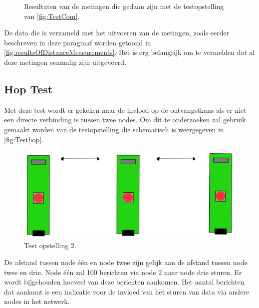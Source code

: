 \begin{figure}[ht]
    \centering
    \caption{Resultaten van de metingen die gedaan zijn met de testopstelling van \autoref{fig:TestCom}.}
    \label{fig:resultsOfDistanceMeasurements}
\end{figure}
De data die is verzameld met het uitvoeren van de metingen, zoals eerder beschreven in deze paragraaf worden getoond in \autoref{fig:resultsOfDistanceMeasurements}. Het is erg belangrijk om te vermelden dat al deze metingen eenmalig zijn uitgevoerd.

\subsection{Hop Test} \label{sec:influenceOfHopsInNetwork}
Met deze test wordt er gekeken naar de invloed op de ontvangstkans als er niet een directe verbinding is tussen twee nodes. Om dit te onderzoeken zal gebruik gemaakt worden van de testopstelling die schematisch is weergegeven in \autoref{fig:Testhop}. 
\begin{figure}[h]
    \centering
    \includegraphics[scale = 0.4]{img/test2.png}
    \caption{Test opstelling 2.}
    \label{fig:Testhop}
\end{figure}
De afstand tussen node één en node twee zijn gelijk aan de afstand tussen node twee en drie. Node één zal 100 berichten via node 2 naar node drie sturen. Er wordt bijgehouden hoeveel van deze berichten aankomen. Het aantal berichten dat aankomt is een indicatie voor de invloed van het sturen van data via andere nodes in het netwerk.

